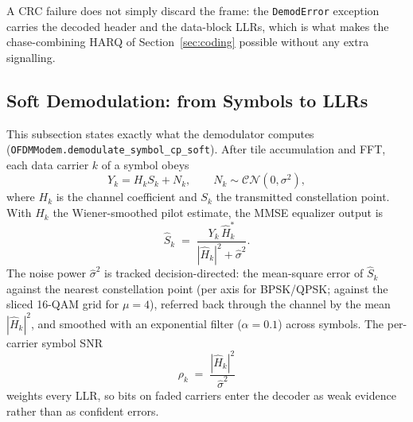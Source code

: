 A CRC failure does not simply discard the frame: the
\texttt{DemodError} exception carries the decoded header and the
data-block LLRs, which is what makes the chase-combining HARQ of
Section~\ref{sec:coding} possible without any extra signalling.

\subsection{Soft Demodulation: from Symbols to LLRs}
\label{sec:llr_math}

This subsection states exactly what the demodulator computes
(\texttt{OFDMModem.demodulate\_symbol\_cp\_soft}).  After tile
accumulation and FFT, each data carrier $k$ of a symbol obeys
\begin{equation}
    Y_k = H_k S_k + N_k,
    \qquad N_k \sim \mathcal{CN}(0, \sigma^2),
\end{equation}
where $H_k$ is the channel coefficient and $S_k$ the transmitted
constellation point.  With $\hat{H}_k$ the Wiener-smoothed pilot
estimate, the MMSE equalizer output is
\begin{equation}
    \hat{S}_k \;=\;
    \frac{Y_k\,\hat{H}_k^{*}}{|\hat{H}_k|^{2} + \hat{\sigma}^{2}} .
    \label{eq:mmse}
\end{equation}
The noise power $\hat\sigma^2$ is tracked decision-directed: the
mean-square error of $\hat S_k$ against the nearest constellation
point (per axis for BPSK/QPSK; against the sliced 16-QAM grid for
$\mu=4$), referred back through the channel by the mean
$|\hat H_k|^2$, and smoothed with an exponential filter
($\alpha = 0.1$) across symbols.  The per-carrier symbol SNR
\begin{equation}
    \rho_k \;=\; \frac{|\hat{H}_k|^{2}}{\hat{\sigma}^{2}}
\end{equation}
weights every LLR, so bits on faded carriers enter the decoder as
weak evidence rather than as confident errors.

